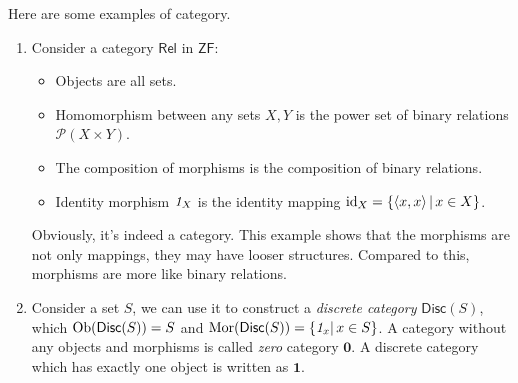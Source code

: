 \documentclass{article}
\begin{document}
\begin{exm}
	Here are some examples of category.
	\begin{enumerate}
		\item Consider a category $\mathsf{Rel}$ in $\mathsf{ZF}$:
		\begin{itemize}
			\item Objects are all sets.
			\item Homomorphism between any sets $X,Y$ is the power set of binary relations $\mathscr{P}(X\times Y)$.
			\item The composition of morphisms is the composition of binary relations.
			\item Identity morphism $\mathit{1}_X$ is the identity mapping $\mathrm{id}_X=\{\left<x,x\right>|\,x\in X\}$.
		\end{itemize}
		Obviously, it's indeed a category. This example shows that the morphisms are not only mappings, they may have looser structures. Compared to this, morphisms are more like binary relations.
	
		\item Consider a set $S$, we can use it to construct a \emph{discrete category} $\mathsf{Disc}(S)$, which $\mathrm{Ob}(\mathsf{Disc}(S))=S$ and $\mathrm{Mor}(\mathsf{Disc}(S))=\{\mathit{1}_x|\,x\in S\}$. A category without any objects and morphisms is called \emph{zero} category $\mathbf{0}$. A discrete category which has exactly one object is written as $\mathbf{1}$.
		

\end{enumerate}
\end{exm}
\end{document}

